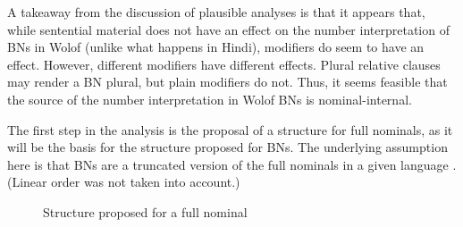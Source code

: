 \documentclass[output=paper]{langscibook}
\begin{document}
A takeaway from the discussion of plausible analyses is that it appears that, while sentential material does not have an effect on the number interpretation of BNs in Wolof (unlike what happens in Hindi), modifiers do seem to have an effect. However, different modifiers have different effects. Plural relative clauses may render a BN plural, but plain modifiers do not. Thus, it seems feasible that the source of the number interpretation in Wolof BNs is nominal-internal.
	
The first step in the analysis is the proposal of a structure for full nominals, as it will be the basis for the structure proposed for BNs. The underlying assumption here is that BNs are a truncated version of the full nominals in a given language \citep{massam2001pseudo}. (Linear order was not taken into account.)
	
	
	\pagebreak

\begin{figure}[h]
\centering
{}
\caption{Structure proposed for a full nominal}
\label{fon:bzKTrEeEinDef}
\end{figure}
	
	
\end{document}
